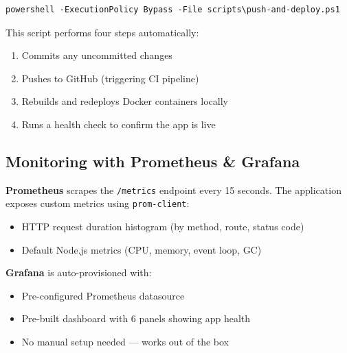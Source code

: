 \documentclass[12pt,a4paper]{article}
\begin{document}
\begin{lstlisting}[caption=Deployment Flow]
powershell -ExecutionPolicy Bypass -File scripts\push-and-deploy.ps1
\end{lstlisting}

This script performs four steps automatically:
\begin{enumerate}[nosep]
    \item Commits any uncommitted changes
    \item Pushes to GitHub (triggering CI pipeline)
    \item Rebuilds and redeploys Docker containers locally
    \item Runs a health check to confirm the app is live
\end{enumerate}

\begin{center}
\end{center}

\subsection{Monitoring with Prometheus \& Grafana}

\textbf{Prometheus} scrapes the \texttt{/metrics} endpoint every 15 seconds. The application exposes custom metrics using \texttt{prom-client}:
\begin{itemize}[nosep]
    \item HTTP request duration histogram (by method, route, status code)
    \item Default Node.js metrics (CPU, memory, event loop, GC)
\end{itemize}

\textbf{Grafana} is auto-provisioned with:
\begin{itemize}[nosep]
    \item Pre-configured Prometheus datasource
    \item Pre-built dashboard with 6 panels showing app health
    \item No manual setup needed --- works out of the box
\end{itemize}

\begin{center}
\end{center}
\end{document}
